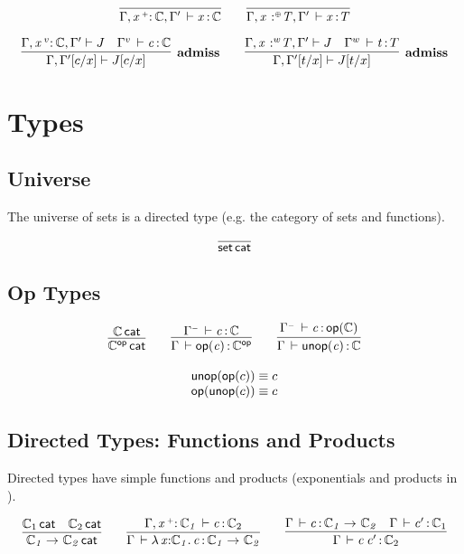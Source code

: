 \documentclass[11pt]{article}
\theoremstyle{plain}
\begin{document}
\[
\infer{\ofdtp{\Gamma,\vtptm{x}{\co}{\C},\Gamma'}{x}{\C}}{}
\qquad
\infer{\oftp{\Gamma,\tptmv{x}{\coc}{T},\Gamma'}{x}{T}}{}
\]

\[
\infer[\textbf{admiss}]
      {\Gamma,\subst{\Gamma'}{c}{x} \vdash \subst{J}{c}{x}}
      {\Gamma,\vtptm{x}{v}{\C},\Gamma' \vdash {J} &
        \oftp{\Gamma^v}{c}{\C}}
\qquad
\infer[\textbf{admiss}]
      {\Gamma,\subst{\Gamma'}{t}{x} \vdash \subst{J}{t}{x}}
      {\Gamma,\tptmv{x}{w}{T},\Gamma' \vdash {J} &
        \oftp{\Gamma^w}{t}{T}}
\]

\section{Types}

\subsection{Universe}

The universe of sets is a directed type (e.g. the category of sets and
functions).

\[
\infer{\wfdtp{\types}}{}
\]


\subsection{Op Types}

\[
\begin{array}{c}
\infer{\wfdtp{\optp{\C}}}
      {\wfdtp{\C}}
\qquad
\infer{\ofdtp{\Gamma}{\optm{c}}{\optp{\C}}}
      {\ofdtp{\Gamma^\con}{c}{\C}}
\qquad
\infer{\ofdtp{\Gamma}{\unop{c}}{{\C}}}
      {\ofdtp{\Gamma^\con}{c}{\optm{\C}}}
\\ \\
\unop{\optm{c}} \deq c \\
\optm{\unop{c}} \deq c
\end{array}
\]

\subsection{Directed Types: Functions and Products}

Directed types have simple functions and products (exponentials and
products in \Cat).

\[
\begin{array}{c}
\infer{\wfdtp{\arr{\C_1}{\C_2}}}
      {\wfdtp{\C_1} &
        \wfdtp{\C_2}}
\qquad
\infer{\ofdtp{\Gamma}{\lam{x}{\C_1}{c}}{\arr {\C_1} {\C_2}}}
      {\ofdtp{\Gamma,\vptptm{x}{\co}{\C_1}}{c}{\C_2}}
\qquad
\infer{\ofdtp{\Gamma}{\app c {c'}}{\C_2}}
      {\ofdtp{\Gamma}{c}{\arr{\C_1}{\C_2}} &
        \ofdtp{\Gamma}{c'}{\C_1}}
\end{array}
\]
\end{document}

